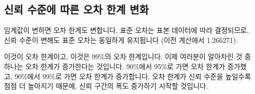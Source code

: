 \documentclass[11pt,a4paper]{article}
\theoremstyle{definition}
\begin{document}
\subsection{신뢰 수준에 따른 오차 한계 변화}

임계값이 변하면 오차 한계도 변합니다. 표준 오차는 표본 데이터에 따라 결정되므로, 신뢰 수준이 변해도 표준 오차는 동일하게 유지됩니다 (이전 계산에서 1.266271).

\begin{tcolorbox}[title=슬라이드 61: 뉴욕 일일 기온 샘플 Excel 시트 (8/13)]
이것이 오차 한계이고, 이것은 99\%의 오차 한계입니다. 이제 여러분이 알아차린 것 중 하나는 오차 한계가 증가한다는 것입니다. 90\%에서 95\%로 가면 오차 한계가 증가했고, 90\%에서 99\%로 가면 오차 한계가 증가합니다. 오차 한계가 신뢰 수준을 높일수록 점점 더 높아지기 때문에, 신뢰 구간의 폭도 증가하기 시작할 것입니다.
\end{tcolorbox}
\end{document}

